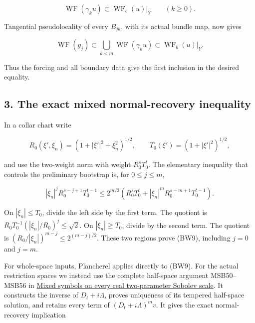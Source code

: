 \documentclass[
  11pt,
]{article}
\makeatletter
\let\ReaderOriginalAnchorStart\hyper@anchorstart
\let\ReaderOriginalAnchorEnd\hyper@anchorend
\let\ReaderPendingAliases\@empty
\def\ReaderArmAliases#1{\gdef\ReaderPendingAliases{#1}}
\def\hyper@anchorstart#1{\ReaderIfNativeAnchorTF{#1}{\ReaderPendingAliases\global\let\ReaderPendingAliases\@empty}{}\ReaderOriginalAnchorStart{#1}}
\makeatother
\begin{document}
\[
 \operatorname{WF}(\gamma_ku)
 \subset\operatorname{WF}_b(u)|_Y
 \qquad(k\geq0).
 \tag{BW6}
\]

Tangential pseudolocality of every \(B_{jk}\), with its actual bundle
map, now gives

\[
 \operatorname{WF}(g_j)
 \subset\bigcup_{k<m}\operatorname{WF}(\gamma_ku)
 \subset\operatorname{WF}_b(u)|_Y.
 \tag{BW7}
\]

Thus the forcing and all boundary data give the first inclusion in the
desired equality.

\ReaderArmAliases{\ReaderOriginalAnchorStart{AN03-BWF-003}\ReaderOriginalAnchorEnd\begingroup\expandafter\def\csname @currentHref\endcsname{AN03-BWF-003}\label{AN03-BWF-003}\endgroup\ReaderOriginalAnchorStart{3-the-exact-mixed-normal-recovery-inequality}\ReaderOriginalAnchorEnd\begingroup\expandafter\def\csname @currentHref\endcsname{3-the-exact-mixed-normal-recovery-inequality}\label{3-the-exact-mixed-normal-recovery-inequality}\endgroup}
\subsection{3. The exact mixed normal-recovery
inequality}\label{the-exact-mixed-normal-recovery-inequality}

In a collar chart write

\[
 R_0(\xi',\xi_n)=(1+|\xi'|^2+\xi_n^2)^{1/2},
 \qquad T_0(\xi')=(1+|\xi'|^2)^{1/2},
 \tag{BW8}
\]

and use the two-weight norm with weight \(R_0^sT_0^t\). The elementary
inequality that controls the preliminary bootstrap is, for
\(0\leq j\leq m\),

\[
 |\xi_n|^jR_0^{s-j+1}T_0^{t-1}
 \leq 2^{m/2}
 \left(R_0^sT_0^t
 +|\xi_n|^mR_0^{s-m+1}T_0^{t-1}\right).
 \tag{BW9}
\]

On \(|\xi_n|\leq T_0\), divide the left side by the first term. The
quotient is \(R_0T_0^{-1}(|\xi_n|/R_0)^j\leq\sqrt2\). On
\(|\xi_n|\geq T_0\), divide by the second term. The quotient is
\((R_0/|\xi_n|)^{m-j}\leq2^{(m-j)/2}\). These two regions prove (BW9),
including \(j=0\) and \(j=m\).

For whole-space inputs, Plancherel applies directly to (BW9). For the
actual restriction spaces we instead use the complete half-space
argument MSB50--MSB56 in \href{mixed-sobolev-mapping.pdf}{Mixed symbols
on every real two-parameter Sobolev scale}. It constructs the inverse of
\(D_t+i\Lambda\), proves uniqueness of its tempered half-space solution,
and retains every term of \((D_t+i\Lambda)^mv\). It gives the exact
normal-recovery implication
\end{document}
